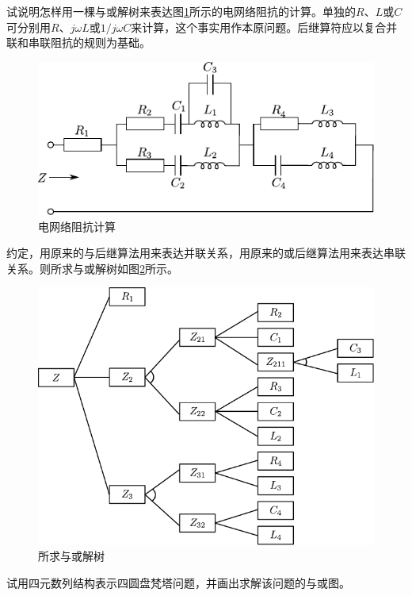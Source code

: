 \begin{question}
试说明怎样用一棵与或解树来表达图\ref{Fig:elec}所示的电网络阻抗的计算。单独的$R$、$L$或$C$可分别用$R$、$j\omega L$或$1/j\omega C$来计算，这个事实用作本原问题。后继算符应以复合并联和串联阻抗的规则为基础。
	\begin{figure}[h]
		\centering
		\includegraphics{figures/ques-2.4.pdf}
		\caption{电网络阻抗计算} \label{Fig:elec}
	\end{figure}
\end{question}
\begin{solution}
约定，用原来的与后继算法用来表达并联关系，用原来的或后继算法用来表达串联关系。则所求与或解树如图\ref{Fig:and-or-tree-for-elec}所示。
	\begin{figure}[h]
		\centering
		\includegraphics{figures/ans-2.4.pdf}
		\caption{所求与或解树} \label{Fig:and-or-tree-for-elec}
	\end{figure}
\end{solution}

\begin{question}
试用四元数列结构表示四圆盘梵塔问题，并画出求解该问题的与或图。
\end{question}
\begin{solution}
\end{solution}

